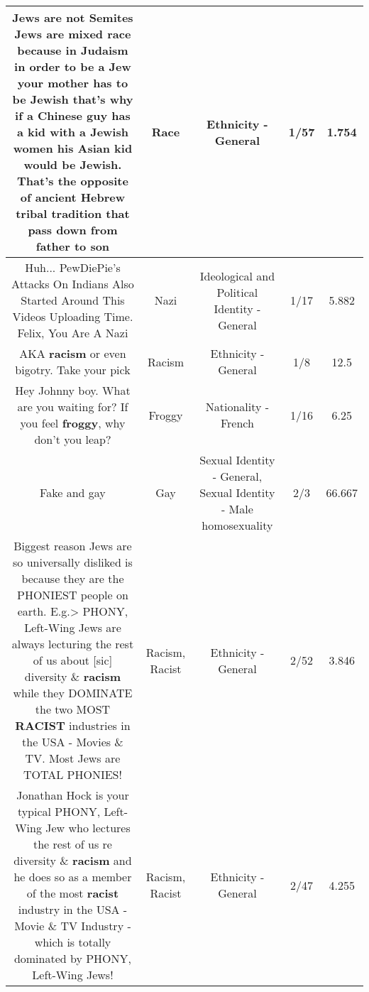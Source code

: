 \documentclass[11pt]{article}
\newlength\mylength
\begin{document}
\begin{center}
\begin{longtable}{|C{.65\mylength}|C{.30\mylength}|C{.12\mylength}|C{.12\mylength}|C{.12\mylength}|}
  \small Jews are not Semites Jews are mixed \textbf{race} because in Judaism in order to be a Jew your mother has to be Jewish that's why if a Chinese guy has a kid with a Jewish women his Asian kid would be Jewish. That's the opposite of ancient Hebrew tribal tradition that pass down from father to son\normalsize   & Race & Ethnicity - General & 1/57 & 1.754 \\  \hline
  \small Huh... PewDiePie's Attacks On Indians Also Started Around This Videos Uploading Time. Felix, You Are A Nazi\normalsize   & Nazi &  Ideological and Political Identity - General & 1/17 & 5.882 \\  \hline
  \small AKA \textbf{racism} or even bigotry. Take your pick\normalsize   & Racism & Ethnicity - General & 1/8 & 12.5 \\  \hline
  \small Hey Johnny boy. What are you waiting for? If you feel \textbf{froggy}, why don't you leap?\normalsize   & Froggy & Nationality - French & 1/16 & 6.25 \\  \hline
  \small Fake and gay\normalsize   & Gay & Sexual Identity - General, Sexual Identity - Male homosexuality & 2/3 & 66.667 \\  \hline
  \small Biggest reason Jews are so universally disliked is because they are the PHONIEST people on earth. E.g.> PHONY, Left-Wing Jews are always lecturing the rest of us about [sic] diversity \& \textbf{racism} while they DOMINATE the two MOST \textbf{RACIST} industries in the USA - Movies \& TV.  Most Jews are TOTAL PHONIES!\normalsize   & Racism, Racist & Ethnicity - General & 2/52 & 3.846 \\  \hline
  \small Jonathan Hock is your typical PHONY, Left-Wing Jew who lectures the rest of us re diversity \& \textbf{racism} and he does so as a member of the most \textbf{racist} industry in the USA - Movie \& TV Industry - which is totally dominated by PHONY, Left-Wing Jews!\normalsize   & Racism, Racist & Ethnicity - General & 2/47 & 4.255 \\  \hline

\end{longtable}
\end{center}
\end{document}

